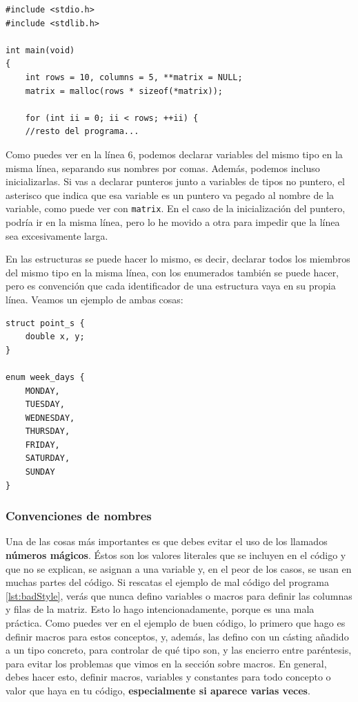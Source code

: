 \documentclass[a4paper]{article}
\begin{document}
\noindent
\begin{minipage}[H]{\linewidth}
\mbox{}
\begin{lstlisting}[style=C,
caption={Declaración de variables en una misma línea},
label={lst:singleLineDeclaration}]
#include <stdio.h>
#include <stdlib.h>

int main(void)
{
    int rows = 10, columns = 5, **matrix = NULL;
    matrix = malloc(rows * sizeof(*matrix));

    for (int ii = 0; ii < rows; ++ii) {
    //resto del programa...
\end{lstlisting}
\end{minipage}

Como puedes ver en la línea 6, podemos declarar variables del mismo tipo
en la misma línea, separando sus nombres por comas. Además, podemos incluso
inicializarlas. Si vas a declarar punteros junto a variables de tipos no
puntero, el asterisco que indica que esa variable es un puntero va pegado al
nombre de la variable, como puede ver con \verb!matrix!. En el caso de la
inicialización del puntero, podría ir en la misma línea, pero lo he movido
a otra para impedir que la línea sea excesivamente larga.

En las estructuras se puede hacer lo mismo, es decir, declarar todos los
miembros del mismo tipo en la misma línea, con los enumerados también se puede
hacer, pero es convención que cada identificador de una estructura vaya en
su propia línea. Veamos un ejemplo de ambas cosas:

\noindent
\begin{minipage}[H]{\linewidth}
\mbox{}
\begin{lstlisting}[style=C,
caption={Declaración de miembros de un \textit{struct} en una sola línea},
label={lst:singleLineDeclarationStruct}]
struct point_s {
    double x, y;
}

enum week_days {
    MONDAY,
    TUESDAY,
    WEDNESDAY,
    THURSDAY,
    FRIDAY,
    SATURDAY,
    SUNDAY
}
\end{lstlisting}
\end{minipage}

\subsubsection{Convenciones de nombres}
Una de las cosas más importantes es que debes evitar el uso de los llamados
\textbf{números mágicos}. Éstos son los valores literales que se incluyen en
el código y que no se explican, se asignan a una variable y, en el peor de los
casos, se usan en muchas partes del código. Si rescatas el ejemplo de mal código
del programa \ref{lst:badStyle}, verás que nunca defino variables o macros para
definir las columnas y filas de la matriz. Esto lo hago intencionadamente,
porque es una mala práctica. Como puedes ver en el ejemplo de buen código,
lo primero que hago es definir macros para estos conceptos, y, además, las
defino con un cásting añadido a un tipo concreto, para controlar de qué tipo
son, y las encierro entre paréntesis, para evitar los problemas que vimos en
la sección sobre macros.
En general, debes hacer esto, definir macros, variables y constantes para todo
concepto o valor que haya en tu código, \textbf{especialmente si aparece varias
veces}.
\end{document}
